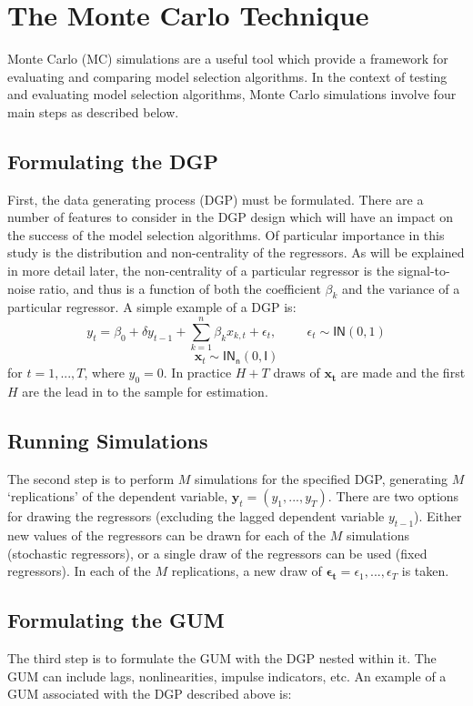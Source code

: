 



\section{The Monte Carlo Technique}

Monte Carlo (MC) simulations are a useful tool which provide a framework for evaluating and comparing model selection algorithms. In the context of testing and evaluating model selection algorithms, Monte Carlo simulations involve four main steps as described below. 

\subsection{Formulating the DGP} 
First, the data generating process (DGP) must be formulated. There are a number of features to consider in the DGP design which will have an impact on the success of the model selection algorithms. Of particular importance in this study is the distribution and non-centrality of the regressors. As will be explained in more detail later, the non-centrality of a particular regressor is the signal-to-noise ratio, and thus is a function of both the coefficient $\beta_{k}$ and the variance of a particular regressor. A simple example of a DGP is:
$$y_{t}=\beta_{0} + \delta y_{t-1}+\sum_{k=1}^{n}\beta_{k}x_{k,t} + \epsilon_{t},\hspace{1cm} \epsilon_{t} \sim \mathsf{IN}(0, 1)$$
$$\textbf{x}_{t} \sim \mathsf{IN_{n}}(0, \mathsf{I}) $$
for $t=1,...,T$, where $y_{0} = 0$. In practice $H+T$ draws of $\mathbf{x_{t}}$ are made and the first $H$ are the lead in to the sample for estimation.


\subsection{Running Simulations}
The second step is to perform $M$ simulations for the specified DGP, generating $M$ `replications' of the dependent variable, $\textbf{y}_{t}=(y_{1},...,y_{T})$. There are two options for drawing the regressors (excluding the lagged dependent variable $y_{t-1}$). Either new values of the regressors can be drawn for each of the $M$ simulations (stochastic regressors), or a single draw of the regressors can be used (fixed regressors). In each of the $M$ replications, a new draw of $\mathbf{\epsilon_{t}} = \epsilon_{1},...,\epsilon_{T}$ is taken.

\subsection{Formulating the GUM}
The third step is to formulate the GUM with the DGP nested within it. The GUM can include lags, nonlinearities, impulse indicators, etc. An example of a GUM associated with the DGP described above is:

